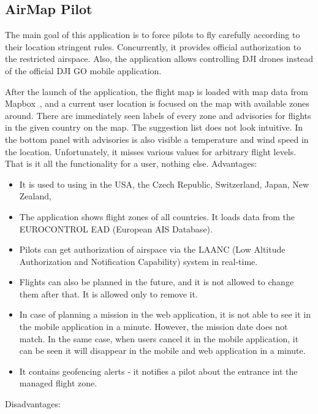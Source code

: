 \subsection{AirMap Pilot}\label{subsec:airmap-pilot}
The main goal of this application is to force pilots to fly carefully according to their location stringent rules.
Concurrently, it provides official authorization to the restricted airspace.
Also, the application allows controlling DJI drones instead of the official DJI GO mobile application.

After the launch of the application, the flight map is loaded with map data from Mapbox~\cite{mapBox}, and a current user location is focused on the map with available zones around.
There are immediately seen labels of every zone and advisories for flights in the given country on the map.
The suggestion list does not look intuitive.
In the bottom panel with advisories is also visible a temperature and wind speed in the location.
Unfortunately, it misses various values for arbitrary flight levels.
That is it all the functionality for a user, nothing else.
\newline
\newline
Advantages:
\begin{itemize}
    \item It is used to using in the USA, the Czech Republic, Switzerland, Japan, New Zealand, \textellipsis
    \item The application shows flight zones of all countries.
    It loads data from the EUROCONTROL EAD (European AIS Database).~\cite{eurocontrol}
    \item Pilots can get authorization of airspace via the LAANC (Low Altitude Authorization and Notification Capability) system in real-time.
    \item Flights can also be planned in the future, and it is not allowed to change them after that.
    It is allowed only to remove it.
    \item In case of planning a mission in the web application, it is not able to see it in the mobile application in a minute.
    However, the mission date does not match.
    In the same case, when users cancel it in the mobile application, it can be seen it will disappear in the mobile and web application in a minute.
    \item It contains geofencing alerts - it notifies a pilot about the entrance int the managed flight zone.
\end{itemize}
Disadvantages:
